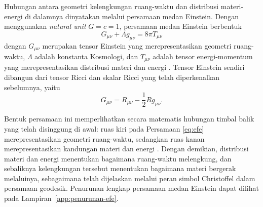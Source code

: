 Hubungan antara geometri kelengkungan ruang-waktu dan distribusi materi-energi
di dalamnya dinyatakan melalui persamaan medan Einstein. Dengan menggunakan
\textit{natural unit} $G = c = 1$, persamaan medan Einstein berbentuk
\begin{equation}
    G_{\mu\nu} + \Lambda g_{\mu\nu} = 8\pi T_{\mu\nu}
    \label{eq:efe}
\end{equation}
\noindent dengan $G_{\mu\nu}$ merupakan tensor Einstein yang merepresentasikan geometri 
ruang-waktu, $\Lambda$ adalah konstanta Kosmologi, dan $T_{\mu\nu}$ adalah tensor 
energi-momentum yang merepresentasikan distribusi materi dan energi \parencite{Carroll2004}. 
Tensor Einstein sendiri dibangun dari tensor Ricci dan skalar Ricci yang telah 
diperkenalkan sebelumnya, yaitu
\begin{equation}
    G_{\mu\nu} = R_{\mu\nu} - \frac{1}{2} R g_{\mu\nu}.
    \label{eq:einstein-tensor}
\end{equation}

Bentuk persamaan ini memperlihatkan secara matematis hubungan timbal balik yang telah 
disinggung di awal: ruas kiri pada Persamaan \eqref{eq:efe} merepresentasikan geometri 
ruang-waktu, sedangkan ruas kanan merepresentasikan kandungan materi dan energi 
\parencite{Schutz2009}. Dengan demikian, distribusi materi dan energi menentukan 
bagaimana ruang-waktu melengkung, dan sebaliknya kelengkungan tersebut menentukan 
bagaimana materi bergerak melaluinya, sebagaimana telah dijelaskan melalui peran simbol 
Christoffel dalam persamaan geodesik. Penurunan lengkap persamaan medan Einstein dapat 
dilihat pada Lampiran~\ref{app:penurunan-efe}.
